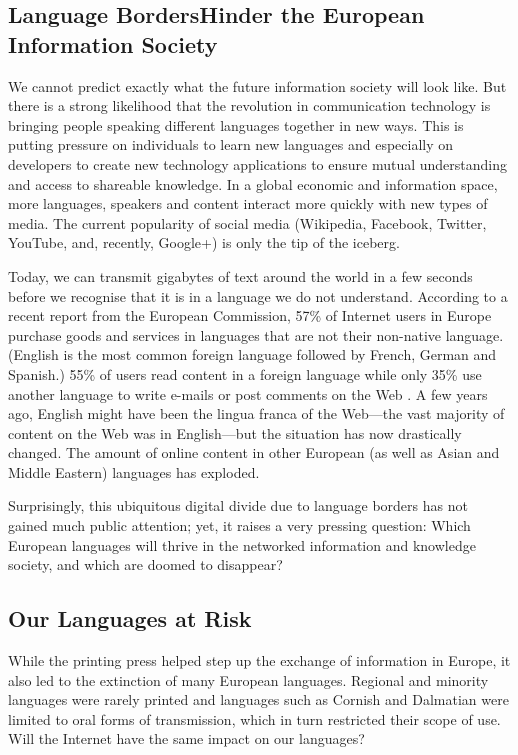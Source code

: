\begin{multicols}{2}
\subsection[Language Borders Hinder the European Information Society]{Language Borders\newline Hinder the European Information Society}

    We cannot predict exactly what the future information society will look like. But there is a strong likelihood that the revolution in communication technology is bringing people speaking different languages together in new ways. This is putting pressure on individuals to learn new languages and especially on developers to create new technology applications to ensure mutual understanding and access to shareable knowledge. In a global economic and information space, more languages, speakers and content interact more quickly with new types of media. The current popularity of social media (Wikipedia, Facebook, Twitter, YouTube, and, recently, Google+) is only the tip of the iceberg.

    Today, we can transmit gigabytes of text around the world in a few seconds before we recognise that it is in a language we do not understand. According to a recent report from the European Commission, 57\% of Internet users in Europe purchase goods and services in languages that are not their non-native language. (English is the most common foreign language followed by French, German and Spanish.) 55\% of users read content in a foreign language while only 35\% use another language to write e-mails or post comments on the Web \cite{CAT-Nota1}. A few years ago, English might have been the lingua franca of the Web—the vast majority of content on the Web was in English—but the situation has now drastically changed. The amount of online content in other European (as well as Asian and Middle Eastern) languages has exploded.

    Surprisingly, this ubiquitous digital divide due to language borders has not gained much public attention; yet, it raises a very pressing question: Which European languages will thrive in the networked information and knowledge society, and which are doomed to disappear?

\subsection{Our Languages at Risk}

    While the printing press helped step up the exchange of information in Europe, it also led to the extinction of many European languages. Regional and minority languages were rarely printed and languages such as Cornish and Dalmatian were limited to oral forms of transmission, which in turn restricted their scope of use. Will the Internet have the same impact on our languages?


\end{multicols}
